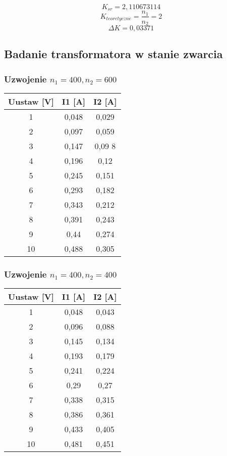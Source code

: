 \documentclass[polish,a4paper]{article}
\begin{document}
$$K_{sr} = 2,110673114$$
$$K_{teoretyczne} = \frac{n_1}{n_2} = 2$$
$$\Delta K = 0,03371$$

\subsection{Badanie transformatora w stanie zwarcia}
\subsubsection{Uzwojenie $n_1 = 400, n_2 = 600$}
\begin{table}[H]
\centering
\begin{tabular}{|c|c|c|}
\hline
Uustaw [V] &  I1 [A] &  I2 [A]  \\
\hline
1 &  0,048 &  0,029  \\
2 &  0,097 &  0,059 \\
3 &  0,147 &  0,09 8 \\
4 &  0,196 &  0,12  \\
5 &  0,245 &  0,151  \\
6 &  0,293 &  0,182  \\
7 &  0,343 &  0,212  \\
8 &  0,391 &  0,243  \\
9 &  0,44 &  0,274  \\
10 &  0,488 &  0,305 \\
\hline
\end{tabular}
\end{table}


\subsubsection{Uzwojenie $n_1 = 400, n_2 = 400$}
\begin{table}[H]
\centering
\begin{tabular}{|c|c|c|}
\hline
Uustaw [V] &  I1 [A] &  I2 [A]  \\
\hline
1 &  0,048 &  0,043  \\
2 &  0,096 &  0,088  \\
3 &  0,145 &  0,134  \\
4 &  0,193 &  0,179  \\
5 &  0,241 &  0,224  \\
6 &  0,29 &  0,27 \\
7 &  0,338 &  0,315 \\
8 &  0,386 &  0,361  \\
9 &  0,433 &  0,405  \\
10 &  0,481 &  0,451  \\
\hline
\end{tabular}
\end{table}
\end{document}
